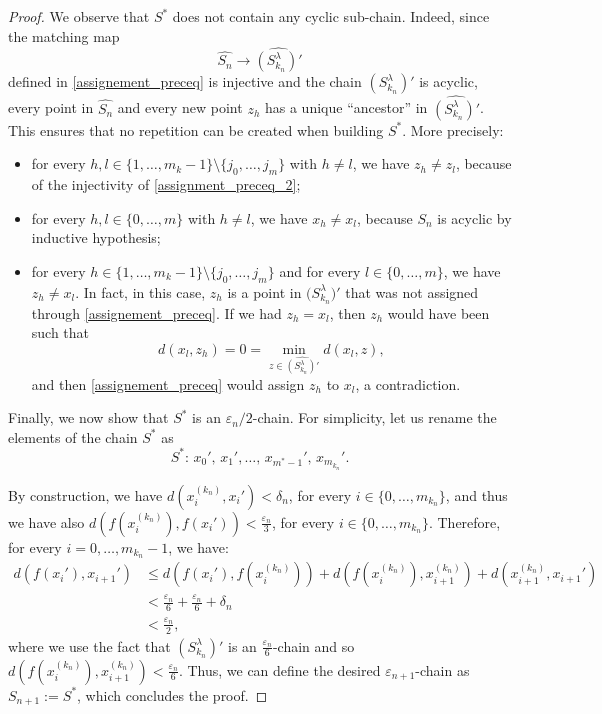 \documentclass[10pt,a4paper]{article}
\theoremstyle{definition}
\theoremstyle{remark}
\theoremstyle{plain}
\begin{document}
\begin{proof}
We observe that $S^*$ does not contain any cyclic sub-chain. Indeed, since the matching map
$$
\widehat{S_n}\longrightarrow \widehat{({S^\lambda_{k_n}})'}
$$
defined in \eqref{assignement_preceq} is injective and the chain $({S^\lambda_{k_n}})'$ is  acyclic, every point in $\widehat{S_n}$ and every new point $z_h$ has a unique ``ancestor'' in $\widehat{({S^\lambda_{k_n}})'}$. This ensures that no repetition can be created when building $S^*$. More precisely:
    \begin{itemize}
        \item for every $h,l\in\{1,\dots,m_k-1\}\setminus\{j_0,\dots,j_m\}$ with $h\neq l$, we have $z_h\neq z_l$, because of the injectivity of \eqref{assignment_preceq_2};
        \item for every $h,l\in\{0,\dots,m\}$ with $h\neq l$, we have $x_h\neq x_l$, because $S_n$ is acyclic by inductive hypothesis;
        \item  for every $h\in\{1,\dots,m_k-1\}\setminus\{j_0,\dots,j_m\}$ and for every $l\in\{0,\dots,m\}$, we have $z_h\neq x_l$. In fact, in this case, $z_h$ is a point in ${(S^\lambda_{k_n}})'$ that was not assigned through \eqref{assignement_preceq}. If we had $z_h=x_l$, then $z_h$ would have been such that
        $$
        d(x_l,z_h)=0=\min_{z\in\widehat{({S^\lambda_{k_n}})'}}d(x_l,z),
        $$
        and then \eqref{assignement_preceq} would assign $z_h$ to $x_l$, a contradiction.
    \end{itemize}
    Finally, we now show that $S^*$ is an $\varepsilon_n/2$-chain. For simplicity, let us rename the elements of the chain $S^*$ as
    $$S^*:\,x_0',\,x_1',\dots,\,x_{m^*-1}',\,x_{m_{k_n}}'.$$

    
    By construction, we have $d(x_i^{(k_n)},x_i')<\delta_n$, for every $i\in\{0,\dots,m_{k_n}\}$, and thus we have also $d(f(x_i^{(k_n)}),f(x_i'))<\frac{\varepsilon_n}{3}$, for every $i\in\{0,\dots,m_{k_n}\}$.
    Therefore, for every $i=0,\dots,m_{k_n}-1$, we have:
    \begin{align*}
        d(f(x_i'), x_{i+1}') &\le d(f(x_i'), f(x_i^{(k_n)})) + d(f(x_i^{(k_n)}), x_{i+1}^{(k_n)}) + d(x_{i+1}^{(k_n)}, x_{i+1}') \\
        &< \frac{\varepsilon_n}{6} + \frac{\varepsilon_n}{6} + \delta_n \\
        &< \frac{\varepsilon_n}{2},
    \end{align*}
    where we use the fact that $({S_{k_n}^\lambda})'$ is an $\frac{\varepsilon_n}{6}$-chain and so $d(f(x_i^{(k_n)}), x_{i+1}^{(k_n)})<\frac{\varepsilon_n}{6}$.
    Thus, we can define the desired $\varepsilon_{n+1}$-chain as $ S_{n+1}:= S^*$, which concludes the proof.
    
\end{proof}
\end{document}
